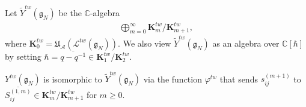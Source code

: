 \documentclass[pdftex]{sigma}
\numberwithin{theorem}{section}
\numberwithin{proposition}{section}
\numberwithin{lemma}{section}
\numberwithin{corollary}{section}
\numberwithin{definition}{section}
\numberwithin{example}{section}
\numberwithin{remark}{section}
\numberwithin{note}{section}
\numberwithin{equation}{section}
\begin{document}
Let $\widetilde{Y}^{tw}(\mathfrak{g}_N)$ be the $\mathbb{C}$-algebra
\begin{gather*}
\bigoplus_{m=0}^{\infty} \mathbf{K}_m^{tw}/\mathbf{K}_{m+1}^{tw},
\end{gather*}
where $\mathbf{K}_0^{tw} = \mathfrak{U}_{\mathcal{A}}(\mathcal{L}^{tw}(\mathfrak{g}_N))$.
We also view $\widetilde{Y}^{tw}(\mathfrak{g}_N)$ as an algebra over $\mathbb{C}[\hbar]$ by setting $\hbar =
\overline{q-q^{-1}} \in \mathbf{K}_1^{tw}/\mathbf{K}_2^{tw}$.

\begin{theorem}
\label{twUqY2}
$Y^{tw}(\mathfrak{g}_N)$ is isomorphic to $\widetilde{Y}^{tw}(\mathfrak{g}_N)$ via the function $\varphi^{tw}$ that
sends $s_{ij}^{(m+1)}$ to $\overline{S_{ij}^{(1,m)}} \in \mathbf{K}_{m}^{tw}/\mathbf{K}_{m+1}^{tw}$ for $m \ge 0$.
\end{theorem}
\end{document}
